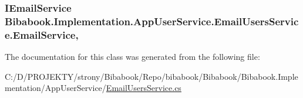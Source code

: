 \subsubsection[{Email\+Service}]{\setlength{\rightskip}{0pt plus 5cm}I\+Email\+Service Bibabook.\+Implementation.\+App\+User\+Service.\+Email\+Users\+Service.\+Email\+Service\hspace{0.3cm}{\ttfamily [get]}, {\ttfamily [set]}}\label{class_bibabook_1_1_implementation_1_1_app_user_service_1_1_email_users_service_a9d0e2425374cd78f72ff2c959739fe86}


The documentation for this class was generated from the following file\+:\begin{DoxyCompactItemize}
\item 
C\+:/\+D/\+P\+R\+O\+J\+E\+K\+T\+Y/strony/\+Bibabook/\+Repo/bibabook/\+Bibabook/\+Bibabook.\+Implementation/\+App\+User\+Service/\hyperlink{_email_users_service_8cs}{Email\+Users\+Service.\+cs}\end{DoxyCompactItemize}
